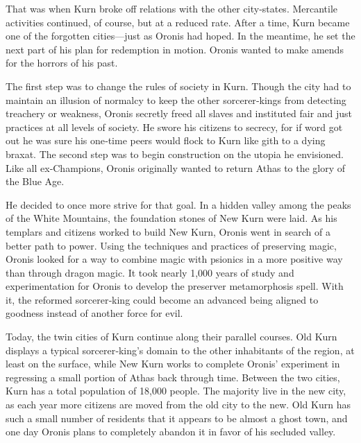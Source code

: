 {	That was when Kurn broke off relations with the other city‐states. Mercantile activities continued, of course, but at a reduced rate. After a time, Kurn became one of the forgotten cities---just as Oronis had hoped. In the meantime, he set the next part of his plan for redemption in motion. Oronis wanted to make amends for the horrors of his past.

	The first step was to change the rules of society in Kurn. Though the city had to maintain an illusion of normalcy to keep the other sorcerer‐kings from detecting treachery or weakness, Oronis secretly freed all slaves and instituted fair and just practices at all levels of society. He swore his citizens to secrecy, for if word got out he was sure his one‐time peers would flock to Kurn like gith to a dying braxat. The second step was to begin construction on the utopia he envisioned. Like all ex‐Champions, Oronis originally wanted to return Athas to the glory of the Blue Age.

	He decided to once more strive for that goal. In a hidden valley among the peaks of the White Mountains, the foundation stones of New Kurn were laid. As his templars and citizens worked to build New Kurn, Oronis went in search of a better path to power. Using the techniques and practices of preserving magic, Oronis looked for a way to combine magic with psionics in a more positive way than through dragon magic. It took nearly 1,000 years of study and experimentation for Oronis to develop the preserver metamorphosis spell. With it, the reformed sorcerer‐king could become an advanced being aligned to goodness instead of another force for evil.

	Today, the twin cities of Kurn continue along their parallel courses. Old Kurn displays a typical sorcerer‐king’s domain to the other inhabitants of the region, at least on the surface, while New Kurn works to complete Oronis’ experiment in regressing a small portion of Athas back through time. Between the two cities, Kurn has a total population of 18,000 people. The majority live in the new city, as each year more citizens are moved from the old city to the new. Old Kurn has such a small number of residents that it appears to be almost a ghost town, and one day Oronis plans to completely abandon it in favor of his secluded valley.
}

